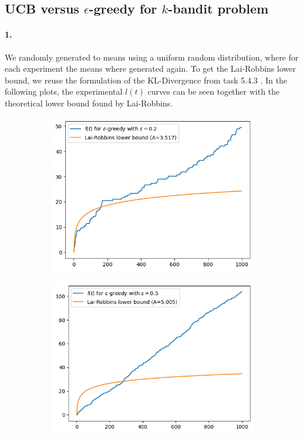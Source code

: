 \subsection{UCB versus $\epsilon$-greedy for $k$-bandit problem}

\paragraph{1.}
We randomly generated to means using a uniform random distribution,
where for each experiment the means where generated again.
To get the Lai-Robbins lower bound, we reuse the formulation of the KL-Divergence from task
5.4.3 . In the following plots, the experimental $l(t)$ curves can be seen together with the 
theoretical lower bound found by Lai-Robbins.
\begin{figure}[ht]
    \centering
    \begin{subfigure}{0.45}
        \centering
        \includegraphics[scale=0.5]{figures/e02.png}
    \end{subfigure}  
    \begin{subfigure}{0.45}
        \centering
        \includegraphics[scale=0.5]{figures/e05.png}

\end{subfigure}
\end{figure}
